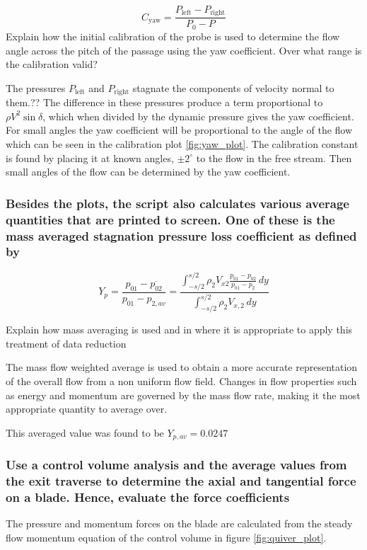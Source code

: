 \documentclass{article}
\begin{document}
\begin{equation}
    C_\text{yaw} = \frac{P_\text{left} - P_\text{right}}{P_0 - P}
\end{equation}
Explain how the initial calibration of the probe is used to determine the flow angle across the
pitch of the passage using the yaw coefficient. Over what range is the calibration valid?

The pressures $P_\text{left}$ and $P_\text{right}$ stagnate the components of velocity normal to them.?? %
The difference in these pressures  produce a term proportional to $\rho V^2 \sin \delta$, which when divided by the dynamic pressure gives the yaw coefficient.
For small angles the yaw coefficient will be proportional to the angle of the flow which can be seen in the calibration plot \ref{fig:yaw_plot}.
The calibration constant is found by placing it at known angles, $\pm 2^\circ$ to the flow in the free stream.
Then small angles of the flow can be determined by the yaw coefficient.

\subsubsection{Besides the plots, the script also calculates various average quantities that are printed
to screen. One of these is the mass averaged stagnation pressure loss coefficient as defined by}


\begin{equation}
    Y_p = \frac{p_{01} - \overline{p_{02}}}{p_{01} - p_{2,av}} = \frac{\int_{-s/2}^{s/2} \rho_2 V_{x2} \frac{p_{01} - p_{02}}{p_{01} - p_2} \, dy}{\int_{-s/2}^{s/2} \rho_2 V_{x,2} \, dy}
\end{equation}

Explain how mass averaging is used and in where it is appropriate to apply this treatment of
data reduction

The mass flow weighted average is used to obtain a more accurate representation of the overall flow from a non uniform flow field.
Changes in flow properties such as energy and momentum are governed by the mass flow rate, making it the most appropriate quantity to average over.

This averaged value was found to be $Y_{p,av} = 0.0247$

\subsubsection{Use a control volume analysis and the average values from the exit traverse to determine
the axial and tangential force on a blade. Hence, evaluate the force coefficients
}
The pressure and momentum forces on the blade are calculated from the steady flow momentum equation of the control volume in figure \ref{fig:quiver_plot}.
\end{document}
